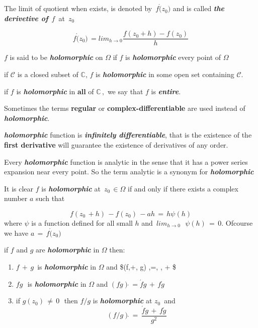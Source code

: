 \documentclass[11pt]{article}
\providecommand{\tightlist}{%
      \setlength{\itemsep}{0pt}\setlength{\parskip}{0pt}}
\begin{document}
The limit of quotient when exists, is denoted by \(\,f\acute(z_{0})\)
and is called \textbf{\emph{the derivetive of}} \(\,f\,\) at \(\,z_{0}\)

\[ f\acute(z_{0})\,=lim_{h\to0}{\frac{f(z_{0}+h)-f(z_{0})}{h}}\]

\(f\) is said to be \textbf{\emph{holomorphic}} on \(\Omega\) if \(f\)
is \textbf{\emph{holomorphic}} every point of \(\Omega\)

if \(\mathcal{C}\) is a closed subset of \(\mathbb{C}\), \(f\) is
\textbf{\emph{holomorphic}} in some open set containing \(\mathcal{C}\).

if \(f\) is \textbf{\emph{holomorphic}} in \textbf{all} of
\(\mathbb{C}\,,\) we say that \(f\) is \textbf{\emph{entire}}.

Sometimes the terms \textbf{regular} or \textbf{complex-differentiable}
are used instead of \textbf{\emph{holomorphic}}.

\textbf{\emph{holomorphic}} function is \textbf{\emph{infinitely
differentiable}}, that is the existence of the \textbf{first derivative}
will guarantee the existence of derivatives of any order.

Every \textbf{\emph{holomorphic}} function is analytic in the sense that
it has a power series expansion near every point. So the term analytic
is a synonym for \textbf{\emph{holomorphic}}

It is clear \(f\) is \textbf{\emph{holomorphic}} at
\(\,z_{0}\,\in\Omega\) if and only if there exists a complex number
\(a\) such that

\[f(z_{0}\,+h)\,-f(z_{0})\,-ah\,=\,h\psi(h)\] where \(\psi\) is a
function defined for all small \(h\) and
\(\,lim_{h\to0}{\,\,\,\,\psi(h)}\,=\,0\). Ofcourse we have
\(a\,=\,f\acute(z_{0})\)

if \(f\) and \(g\) are \textbf{\emph{holomorphic}} in \(\Omega\) then:

\begin{enumerate}
\def\labelenumi{\arabic{enumi}.}
\tightlist
\item
  \(f\,+\,g\,\) is \textbf{\emph{holomorphic}} in \(\Omega\) and \$(f,+,
  g)\acute{} ,=, , +  \$
\item
  \(fg\,\,\) is \textbf{\emph{holomorphic}} in \(\Omega\) and
  \((fg)\acute{} \,=\acute{f}g\,+\,f\acute{g}\,\)
\item
  if \(g(z_{0}) \,\ne\, 0\,\,\) then \(f/g\) is
  \textbf{\emph{holomorphic}} at \(z_{0}\,\) and
  \[(f/g)\acute{}\,= \,\frac{\acute{f}g\,+\,f\acute{g}}{g^{2}}\]
\end{enumerate}
\end{document}
